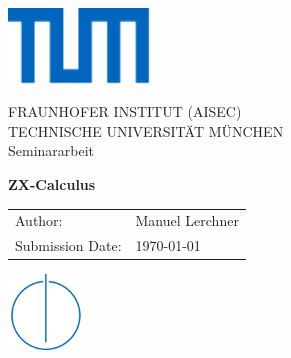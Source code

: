 \documentclass[12pt,a4paper]{report}
\begin{document}
\newcommand*{\getUniversity}{Technische Universität München}
\newcommand*{\getFaculty}{Fraunhofer Institut (AISEC)}
\newcommand*{\getTitle}{ZX-Calculus}
\newcommand*{\getAuthor}{Manuel Lerchner}
\newcommand*{\getDoctype}{Seminararbeit}
\newcommand*{\getSubmissionDate}{\today}

\begin{titlepage}
    \centering

    \includegraphics[height=20mm]{../logos/tum.pdf}
    \vspace*{20mm}

    \vspace{5mm}
    {\huge\MakeUppercase{\getFaculty{}}}\\

    \vspace{5mm}
    {\large\MakeUppercase{\getUniversity{}}}\\

    \vspace{20mm}
    {\Large \getDoctype{}}

    \vspace{15mm}
    {\huge\bfseries \getTitle{}}

    \vspace{15mm}
    \begin{tabular}{l l}
        Author:          & \getAuthor{}         \\
        Submission Date: & \getSubmissionDate{} \\
    \end{tabular}


    \vfill

    \includegraphics[height=20mm]{../logos/faculty.png}
\end{titlepage}
\end{document}
